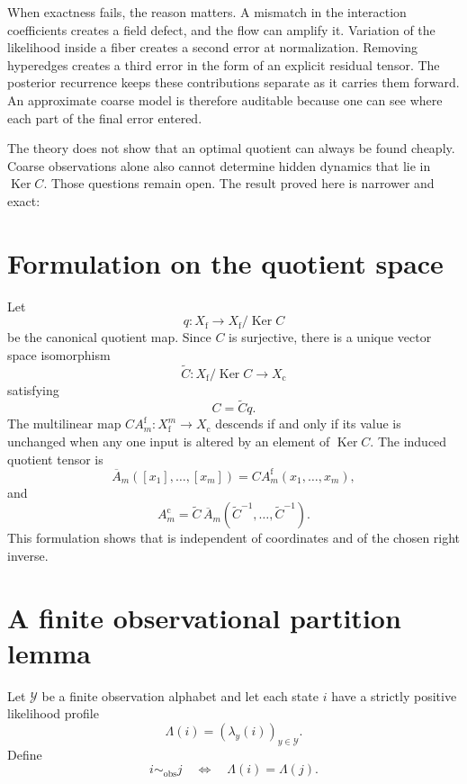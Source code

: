 \documentclass[11pt]{article}
\theoremstyle{definition}
\theoremstyle{remark}
\newcommand{\cY}{\mathcal Y}
\newcommand{\Ker}{\operatorname{Ker}}
\newcommand{\fine}{\mathrm f}
\newcommand{\coarse}{\mathrm c}
\begin{document}
When exactness fails, the reason matters.  A mismatch in the interaction coefficients creates a field defect, and the flow can amplify it.  Variation of the likelihood inside a fiber creates a second error at normalization.  Removing hyperedges creates a third error in the form of an explicit residual tensor.  The posterior recurrence keeps these contributions separate as it carries them forward.  An approximate coarse model is therefore auditable because one can see where each part of the final error entered.

The theory does not show that an optimal quotient can always be found cheaply.  Coarse observations alone also cannot determine hidden dynamics that lie in $\Ker C$.  Those questions remain open.  The result proved here is narrower and exact:
\begin{center}
\end{center}

\appendix

\section{Formulation on the quotient space}\label{app:quotient}
Let
\[
  q:X_{\fine}\to X_{\fine}/\Ker C
\]
be the canonical quotient map.  Since $C$ is surjective, there is a unique vector space isomorphism
\[
  \widetilde C:X_{\fine}/\Ker C\to X_{\coarse}
\]
satisfying
\[
  C=\widetilde Cq.
\]
The multilinear map $CA_m^{\fine}:X_{\fine}^m\to X_{\coarse}$ descends if and only if its value is unchanged when any one input is altered by an element of $\Ker C$.  The induced quotient tensor is
\[
  \overline A_m
  ([x_1],\ldots,[x_m])
  =CA_m^{\fine}(x_1,\ldots,x_m),
\]
and
\[
  A_m^{\coarse}
  =
  \widetilde C\,
  \overline A_m
  (\widetilde C^{-1},\ldots,\widetilde C^{-1}).
\]
This formulation shows that  is independent of coordinates and of the chosen right inverse.

\section{A finite observational partition lemma}\label{app:observation-partition}
Let $\cY$ be a finite observation alphabet and let each state $i$ have a strictly positive likelihood profile
\[
  \Lambda(i)
  =
  (\lambda_y(i))_{y\in\cY}.
\]
Define
\[
  i\sim_{\mathrm{obs}}j
  \quad\Longleftrightarrow\quad
  \Lambda(i)=\Lambda(j).
\]
\end{document}
